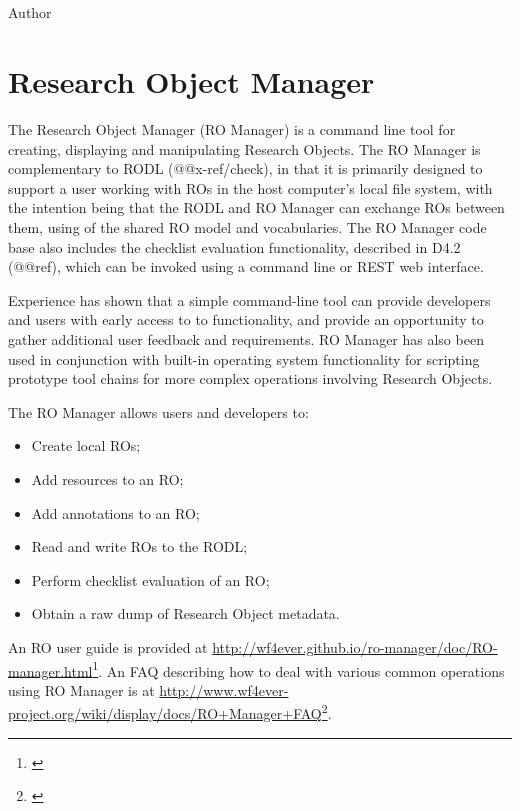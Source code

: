 \documentclass[11pt,oneside]{article}
\title{\mytitle \\ \mysubtitle}
\author{\myauthor}
\def\myauthor{Author}
\def\mycopyright{\myauthor}
\begin{document}

\maketitle

\textcopyright{} \mycopyright

%
%


\setlength{\parindent}{1em}

\section{Research Object Manager}
\label{researchobjectmanager}

The Research Object Manager (RO Manager) is a command line tool for creating, displaying and manipulating Research Objects. The RO Manager is complementary to RODL (@@x-ref/check), in that it is primarily designed to support a user working with ROs in the host computer's local file system, with the intention being that the RODL and RO Manager can exchange ROs between them, using of the shared RO model and vocabularies.  The RO Manager code base also includes the checklist evaluation functionality, described in D4.2 (@@ref), which can be invoked using a command line or REST web interface.

Experience has shown that a simple command-line tool can provide developers and users with early access to to functionality, and provide an opportunity to gather additional user feedback and requirements.  RO Manager has also been used in conjunction with built-in operating system functionality for scripting prototype tool chains for more complex operations involving Research Objects.

The RO Manager allows users and developers to:

\begin{itemize}

\item Create local ROs;
\item Add resources to an RO;
\item Add annotations to an RO;
\item Read and write ROs to the RODL;
\item Perform checklist evaluation of an RO;
\item Obtain a raw dump of Research Object metadata.
\end{itemize}

An RO user guide is provided at \href{}{http://wf4ever.github.io/ro-manager/doc/RO-manager.html}\footnote{\href{}{}}.  An FAQ describing how to deal with various common operations using RO Manager is at \href{}{http://www.wf4ever-project.org/wiki/display/docs/RO+Manager+FAQ}\footnote{\href{}{}}.
\end{document}

